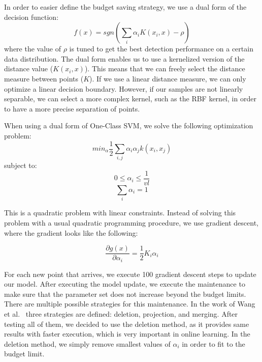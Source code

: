 \documentclass{llncs}
\begin{document}
In order to easier define the budget saving strategy, we use a dual form of the decision function: 
%
\begin{equation}
f(x) = sgn(\sum_i \alpha_i K(x_i,x) - \rho)
\end{equation}
%
where the value of $\rho$ is tuned to get the best detection performance on a certain data distribution. The dual form enables us to use a kernelized version of the distance value ($K(x_i,x)$). This means that we can freely select the distance measure between points ($K$). If we use a linear distance measure, we can only optimize a linear decision boundary. However, if our samples are not linearly separable, we can select a more complex kernel, such as the RBF kernel, in order to have a more precise separation of points.

When using a dual form of One-Class SVM, we solve the following optimization problem:
%
\begin{equation}
min_{\alpha} \frac{1}{2} \sum_{i,j} \alpha_i \alpha_j k(x_i, x_j) \end{equation}
subject to:
\begin{equation}
0\leq \alpha_i \leq \frac{1}{vl} 
\end{equation}
\begin{equation}
\sum_{i} \alpha_i = 1
\end{equation}

This is a quadratic problem with linear constraints. Instead of solving this problem with a usual quadratic programming procedure, we use gradient descent, where the gradient looks like the following:

\begin{equation}
\frac{\partial g(x)}{\partial \alpha_i} = \frac{1}{2}  K_i  \alpha_i
\end{equation}

For each new point that arrives, we execute 100 gradient descent steps to update our model.
%
After executing the model update, we execute the maintenance to make sure that the parameter set does not increase beyond the budget limits. There are multiple possible strategies for this maintenance. In the work of Wang et al.~\cite{wang2012breaking} three strategies are defined: deletion, projection, and merging. After testing all of them, we decided to use the deletion method, as it provides same results with faster execution, which is very important in online learning. In the deletion method, we simply remove smallest values of $ \alpha_i$ in order to fit to the budget limit.
\end{document}
